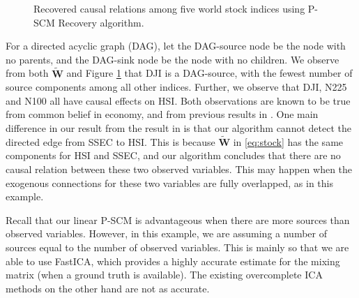\documentclass[12pt]{article}
\newcommand{\bW}{\mathbf{W}}
\begin{document}
\begin{figure}[tbp]
\centering
  \caption{Recovered causal relations among five world stock indices using P-SCM Recovery algorithm.}
\label{fig:stock}
\end{figure}

For a directed acyclic graph (DAG), let the DAG-source node be the node with no parents, and the DAG-sink node be the node with no children. We observe from both $\tilde{\bW}$ and Figure \ref{fig:stock} that DJI is a DAG-source, with the fewest number of source components among all other indices. Further, we observe that DJI, N225 and N100 all have causal effects on HSI. Both observations are known to be true from common belief in economy, and from previous results in \citep{hyvarinen2010estimation,salehkaleybar2020learning}. One main difference in our result from the result in \citep{hyvarinen2010estimation} is that our algorithm cannot detect the directed edge from SSEC to HSI. This is because $\tilde{\bW}$ in \eqref{eq:stock} has the same components for HSI and SSEC, and our algorithm concludes that there are no causal relation between these two observed variables. This may happen when the exogenous connections for these two variables are fully overlapped, as in this example. %

Recall that our linear P-SCM is advantageous when there are more sources than observed variables. However, in this example, we are assuming a number of sources equal to the number of observed variables. This is mainly so that we are able to use FastICA, which provides a highly accurate estimate for the mixing matrix (when a ground truth is available). The existing overcomplete ICA methods on the other hand are not as accurate.
\end{document}
